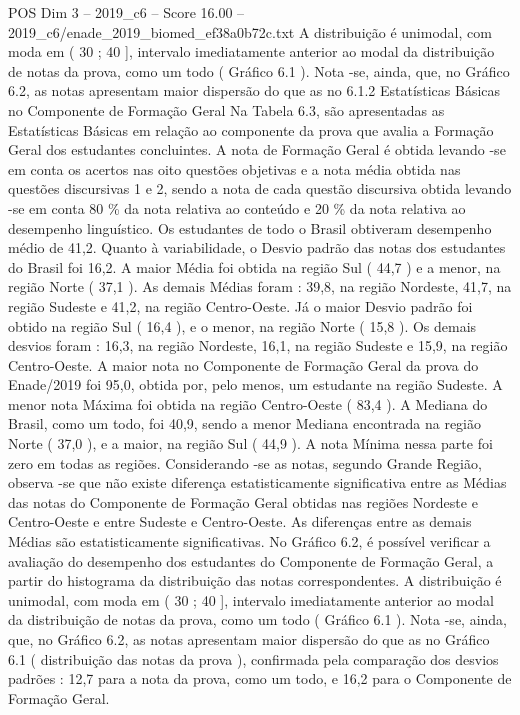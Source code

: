 \begin{textsample}{POS Dim 3 – 2019\_c6 – Score 16.00 – 2019\_c6/enade\_2019\_biomed\_ef38a0b72c.txt}
A distribuição é unimodal, com moda em ( 30 ; 40 ], intervalo imediatamente anterior ao modal da distribuição de notas da prova, como um todo ( Gráfico 6.1 ).
Nota -se, ainda, que, no Gráfico 6.2, as notas apresentam maior dispersão do que as no 6.1.2 Estatísticas Básicas no Componente de Formação Geral Na Tabela 6.3, são apresentadas as Estatísticas Básicas em relação ao componente da prova que avalia a Formação Geral dos estudantes concluintes.
A nota de Formação Geral é obtida levando -se em conta os acertos nas oito questões objetivas e a nota média obtida nas questões discursivas 1 e 2, sendo a nota de cada questão discursiva obtida levando -se em conta 80 \% da nota relativa ao conteúdo e 20 \% da nota relativa ao desempenho linguístico.
Os estudantes de todo o Brasil obtiveram desempenho médio de 41,2.
Quanto à variabilidade, o Desvio padrão das notas dos estudantes do Brasil foi 16,2.
A maior Média foi obtida na região Sul ( 44,7 ) e a menor, na região Norte ( 37,1 ).
As demais Médias foram : 39,8, na região Nordeste, 41,7, na região Sudeste e 41,2, na região Centro-Oeste.
Já o maior Desvio padrão foi obtido na região Sul ( 16,4 ), e o menor, na região Norte ( 15,8 ).
Os demais desvios foram : 16,3, na região Nordeste, 16,1, na região Sudeste e 15,9, na região Centro-Oeste.
A maior nota no Componente de Formação Geral da prova do Enade/2019 foi 95,0, obtida por, pelo menos, um estudante na região Sudeste.
A menor nota Máxima foi obtida na região Centro-Oeste ( 83,4 ).
A Mediana do Brasil, como um todo, foi 40,9, sendo a menor Mediana encontrada na região Norte ( 37,0 ), e a maior, na região Sul ( 44,9 ).
A nota Mínima nessa parte foi zero em todas as regiões.
Considerando -se as notas, segundo Grande Região, observa -se que não existe diferença estatisticamente significativa entre as Médias das notas do Componente de Formação Geral obtidas nas regiões Nordeste e Centro-Oeste e entre Sudeste e Centro-Oeste.
As diferenças entre as demais Médias são estatisticamente significativas.
No Gráfico 6.2, é possível verificar a avaliação do desempenho dos estudantes do Componente de Formação Geral, a partir do histograma da distribuição das notas correspondentes.
A distribuição é unimodal, com moda em ( 30 ; 40 ], intervalo imediatamente anterior ao modal da distribuição de notas da prova, como um todo ( Gráfico 6.1 ).
Nota -se, ainda, que, no Gráfico 6.2, as notas apresentam maior dispersão do que as no Gráfico 6.1 ( distribuição das notas da prova ), confirmada pela comparação dos desvios padrões : 12,7 para a nota da prova, como um todo, e 16,2 para o Componente de Formação Geral.

\end{textsample}
